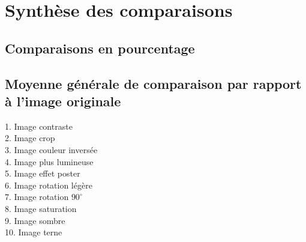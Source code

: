 \section{Synthèse des comparaisons}\label{synthese-des-comparaisons}

\subsection{Comparaisons en pourcentage}
\begin{table}[htbp]
\centering
{}
\end{table}

\subsection{Moyenne générale de comparaison par rapport à l'image originale}
\begin{bchart}[step=10,max=50,width=7in]
\centering
            \smallskip
            \smallskip
            \smallskip
            \smallskip
            \smallskip
            \smallskip
            \smallskip
            \smallskip
            \smallskip
\end{bchart}

1.  Image contraste \\
2.  Image crop \\
3.  Image couleur inversée \\
4.  Image plus lumineuse \\
5.  Image effet poster \\
6.  Image rotation légère \\
7.  Image rotation $90^{\circ}$ \\
8.  Image saturation \\
9.  Image sombre \\
10. Image terne \\
